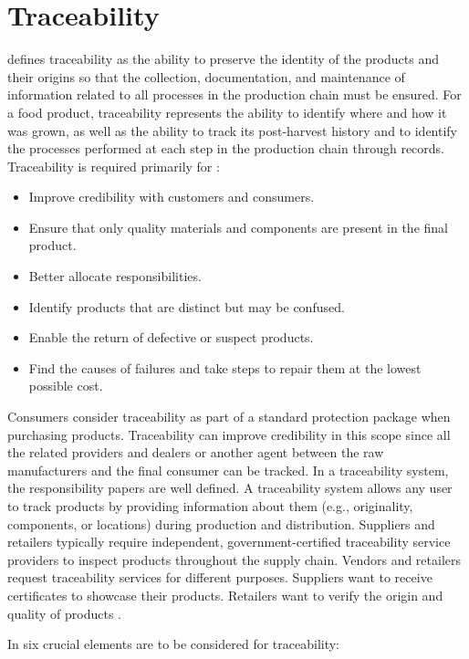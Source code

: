 \section{Traceability}\label{sec:traceability}

 defines traceability as the ability to preserve the identity of the products and their origins so that the collection, documentation, and maintenance of information related to all processes in the production chain must be ensured. For a food product, traceability represents the ability to identify where and how it was grown, as well as the ability to track its post-harvest history and to identify the processes performed at each step in the production chain through records. Traceability is required primarily for \cite{horiuchirastreabilidade}:
\begin{itemize}
\item Improve credibility with customers and consumers.
\item Ensure that only quality materials and components are present in the final product.
\item Better allocate responsibilities.
\item Identify products that are distinct but may be confused.
\item Enable the return of defective or suspect products.
\item Find the causes of failures and take steps to repair them at the lowest possible cost.
\end{itemize}

Consumers consider traceability as part of a standard protection package when purchasing products. Traceability can improve credibility in this scope since all the related providers and dealers or another agent between the raw manufacturers and the final consumer can be tracked. In a traceability system, the responsibility papers are well defined. A traceability system allows any user to track products by providing information about them (e.g., originality, components, or locations) during production and distribution. Suppliers and retailers typically require independent, government-certified traceability service providers to inspect products throughout the supply chain. Vendors and retailers request traceability services for different purposes. Suppliers want to receive certificates to showcase their products. Retailers want to verify the origin and quality of products \cite{lu2017adaptable}.


In \cite{opara2003traceability} six crucial elements are to be considered for traceability:

